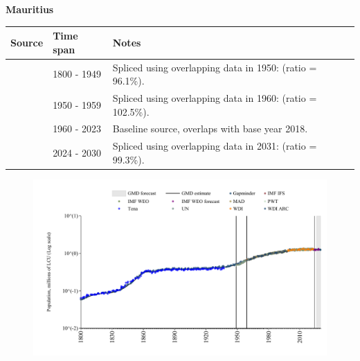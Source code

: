 \documentclass[12pt,a4paper,landscape]{article}
\begin{document}
\begin{adjustbox}{max totalsize={\paperwidth}{\paperheight},center}
\begin{minipage}[t][\textheight][t]{\textwidth}
\vspace*{0.5cm}
{}
\begin{center}
{\Large\bfseries Mauritius}
\end{center}
\vspace{0.5cm}
\begin{table}[H]
\centering
\small
\begin{tabular}{|l|l|l|}
\hline
\textbf{Source} & \textbf{Time span} & \textbf{Notes} \\
\hline
\rowcolor{white}\cite{Gapminder}& 1800 - 1949 &Spliced using overlapping data in 1950: (ratio = 96.1\%).\\
\rowcolor{lightgray}\cite{IMF_IFS}& 1950 - 1959 &Spliced using overlapping data in 1960: (ratio = 102.5\%).\\
\rowcolor{white}\cite{WDI}& 1960 - 2023 &Baseline source, overlaps with base year 2018.\\
\rowcolor{lightgray}\cite{Gapminder}& 2024 - 2030 &Spliced using overlapping data in 2031: (ratio = 99.3\%).\\
\hline
\end{tabular}
\end{table}
\begin{figure}[H]
\centering
\includegraphics[width=\textwidth,height=0.6\textheight,keepaspectratio]{graphs/MUS_pop.pdf}
\end{figure}
\end{minipage}
\end{adjustbox}
\end{document}
